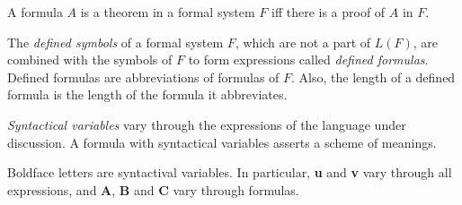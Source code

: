 \begin{fact}
    A formula $A$ is a theorem in a formal system $F$ iff there is a proof of $A$ in $F$.
\end{fact}

\begin{definition}
    The \emph{defined symbols} of a formal system $F$, which are not a part of $L(F)$, are
    combined with the symbols of $F$ to form expressions called \emph{defined formulas}.
    Defined formulas are abbreviations of formulas of $F$. Also, the length of a defined formula
    is the length of the formula it abbreviates.
\end{definition}

\begin{definition}
    \emph{Syntactical variables} vary through the expressions of the language under discussion.
    A formula with syntactical variables asserts a scheme of meanings.
\end{definition}

\begin{convention}
    Boldface letters are syntactival variables. In particular, \textbf{u} and \textbf{v}
    vary through all expressions, and \textbf{A}, \textbf{B} and \textbf{C} vary through formulas.
\end{convention}